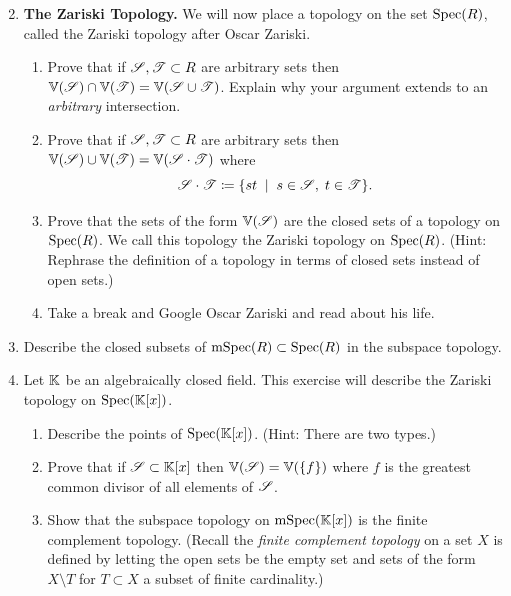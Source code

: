 \documentclass[12pt,reqno]{amsart}
\begin{document}
\hrulefill

\begin{enumerate}[leftmargin=*]
 \setcounter{enumi}{1}
\item \textbf{The Zariski Topology.} We will now place a topology on the set $\operatorname{Spec}(R)$,  called the Zariski topology after Oscar Zariski. 
\begin{enumerate}[label=(\alph*),ref=\theenumi\alph*]
	\item Prove that if  $\mathcal{S}, \mathcal{T} \subset R$ are arbitrary sets then $\mathbb{V}(\mathcal{S}) \cap \mathbb{V}(\mathcal{T}) = \mathbb{V}(\mathcal{S} \cup \mathcal{T})$. Explain why your argument extends to an \emph{arbitrary} intersection. 
	\item Prove that if  $\mathcal{S}, \mathcal{T} \subset R$ are arbitrary sets then $\mathbb{V}(\mathcal{S}) \cup \mathbb{V}(\mathcal{T}) = \mathbb{V}(\mathcal{S} \cdot \mathcal{T})$ where 
\[
\mathcal{S} \cdot \mathcal{T} \coloneqq \{ st \;\; |\;\; s \in \mathcal{S},\; t \in \mathcal{T}\}.
\]
	\item Prove that the sets of the form $\mathbb{V}(\mathcal{S})$ are the closed sets of a topology on $\operatorname{Spec}(R)$. We call this topology the Zariski topology on $\operatorname{Spec}(R)$. (Hint: Rephrase the definition of a topology in terms of closed sets instead of open sets.) 
	\item Take a break and Google Oscar Zariski and read about his life. 
\end{enumerate}

\item Describe the closed subsets of $\operatorname{mSpec}(R) \subset \operatorname{Spec}(R)$ in the subspace topology.

\item Let $\mathbb{K}$ be an algebraically closed field. This exercise will describe the Zariski topology on $\operatorname{Spec}(\mathbb{K}[x])$. 
\begin{enumerate}[label=(\alph*),ref=\theenumi\alph*]
	\item Describe the points of $\operatorname{Spec}(\mathbb{K}[x])$. (Hint: There are two types.)
	\item Prove that if $\mathcal{S} \subset \mathbb{K}[x]$ then $\mathbb{V}(\mathcal{S}) = \mathbb{V}(\{f\})$ where $f$ is the greatest common divisor of all elements of $\mathcal{S}$. 
	\item Show that the subspace topology on $\operatorname{mSpec}(\mathbb{K}[x])$ is the finite complement topology. (Recall the \emph{finite complement topology} on a set $X$ is defined by letting the open sets be the empty set and sets of the form $X \setminus T$ for $T \subset X$ a subset of finite cardinality.)
\end{enumerate}


\end{enumerate}
\end{document}
